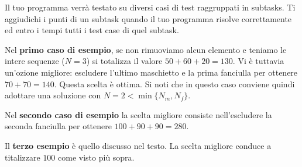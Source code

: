 \Scoring
Il tuo programma verrà testato su diversi casi di test raggruppati in subtasks.
Ti aggiudichi i punti di un subtask quando il tuo programma risolve correttamente ed entro i tempi tutti i test case di quel subtask.









\Examples
\begin{example}
%
%
%
\end{example}


\Explanation
Nel \textbf{primo caso di esempio}, se non rimuoviamo alcun elemento e teniamo le intere sequenze ($N=3$) si totalizza il valore $50 + 60 + 20 = 130$. Vi è tuttavia un'ozione migliore: escludere l'ultimo maschietto e la prima fanciulla per ottenere $70 + 70 = 140$. Questa scelta è ottima. Si noti che in questo caso conviene quindi adottare una soluzione con $N = 2 < \min\{N_m,N_f\}$.

Nel \textbf{secondo caso di esempio} la scelta migliore consiste nell'escludere la seconda fanciulla per ottenere $100 + 90 + 90 = 280$.

Il \textbf{terzo esempio} è quello discusso nel testo. La scelta migliore conduce a titalizzare $100$ come visto più sopra.
